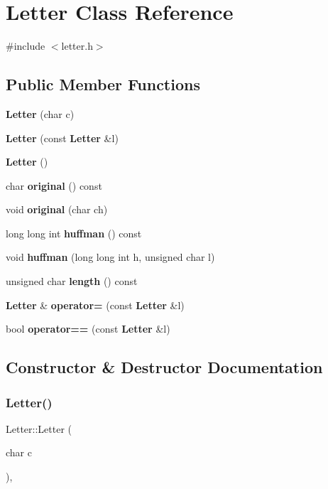 \section{Letter Class Reference}
\label{class_letter}


{\ttfamily \#include $<$letter.\+h$>$}

\subsection*{Public Member Functions}
\begin{DoxyCompactItemize}
\item 
\textbf{ Letter} (char c)
\item 
\textbf{ Letter} (const \textbf{ Letter} \&l)
\item 
\textbf{ Letter} ()
\item 
char \textbf{ original} () const
\item 
void \textbf{ original} (char ch)
\item 
long long int \textbf{ huffman} () const
\item 
void \textbf{ huffman} (long long int h, unsigned char l)
\item 
unsigned char \textbf{ length} () const
\item 
\textbf{ Letter} \& \textbf{ operator=} (const \textbf{ Letter} \&l)
\item 
bool \textbf{ operator==} (const \textbf{ Letter} \&l)
\end{DoxyCompactItemize}


\subsection{Constructor \& Destructor Documentation}
\mbox{\label{class_letter_aa33f1a7d59948007cabb7cb3060fbbdd}} 
\subsubsection{Letter()\hspace{0.1cm}{\footnotesize\ttfamily [1/3]}}
{\footnotesize\ttfamily Letter\+::\+Letter (\begin{DoxyParamCaption}\item[{char}]{c }\end{DoxyParamCaption})\hspace{0.3cm}{\ttfamily [inline]}, {\ttfamily [explicit]}}

